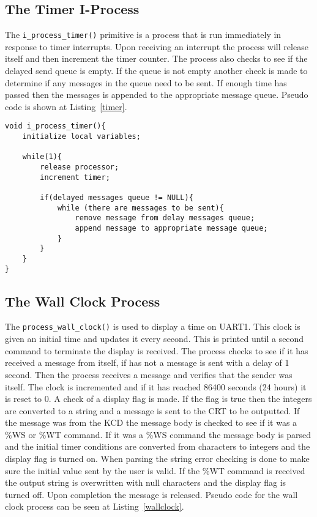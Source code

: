 \documentclass[oneside]{article}
\begin{document}
\subsection*{The Timer I-Process}

The \texttt{i\_process\_timer()} primitive is a process that is run immediately in response to timer interrupts.
Upon receiving an interrupt the process will release itself and then increment the timer counter. The process 
also checks to see if the delayed send queue is empty. If the queue is not empty another check is made to determine 
if any messages in the queue need to be sent. If enough time has passed then the messages is appended to the appropriate 
message queue. Pseudo code is shown at Listing~\ref{timer}.

\begin{lstlisting}
void i_process_timer(){
    initialize local variables;

    while(1){
        release processor;
        increment timer;

        if(delayed messages queue != NULL){
            while (there are messages to be sent){
                remove message from delay messages queue;
                append message to appropriate message queue;
            }
        }
    }
}
\end{lstlisting}

\subsection*{The Wall Clock Process}

The \texttt{process\_wall\_clock()} is used to display a time on UART1. This clock is given an initial time and updates it every 
second. This is printed until a second command to terminate the display is received. The process checks to see if it has received 
a message from itself, if has not a message is sent with a delay of 1 second. Then the process receives a message and verifies that
the sender was itself. The clock is incremented and if it has reached 86400 seconds (24 hours) it is reset to 0. A check of a display 
flag is made. If the flag is true then the integers are converted to a string and a message is sent to the CRT to be outputted. 
If the message was from the KCD the message body is checked to see if it was a \%WS or \%WT command. If it was a \%WS command the message 
body is parsed and the initial timer conditions are converted from characters to integers and the display flag is turned on. When parsing 
the string error checking is done to make sure the initial value sent by the user is valid. If the \%WT command is received the output 
string is overwritten with null characters and the display flag is turned off. Upon completion the message is released. Pseudo code for 
the wall clock process can be seen at Listing~\ref{wallclock}.
\end{document}
